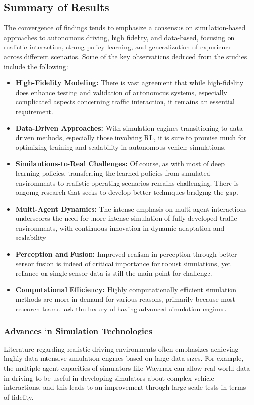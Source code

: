 \documentclass[lettersize,journal]{IEEEtran}
\begin{document}
\subsection{Summary of Results}
The convergence of findings tends to emphasize a consensus on simulation-based approaches to autonomous driving, high fidelity, and data-based, focusing on realistic interaction, strong policy learning, and generalization of experience across different scenarios. Some of the key observations deduced from the studies include the following:

\begin{itemize}
    \item \textbf{High-Fidelity Modeling:} There is vast agreement that while high-fidelity does enhance testing and validation of autonomous systems, especially complicated aspects concerning traffic interaction, it remains an essential requirement.
    \item \textbf{Data-Driven Approaches:} With simulation engines transitioning to data-driven methods, especially those involving RL, it is sure to promise much for optimizing training and scalability in autonomous vehicle simulations.
    \item \textbf{Similautions-to-Real Challenges:} Of course, as with most of deep learning policies, transferring the learned policies from simulated environments to realistic operating scenarios remains challenging. There is ongoing research that seeks to develop better techniques bridging the gap.
    \item \textbf{Multi-Agent Dynamics:} The intense emphasis on multi-agent interactions underscores the need for more intense simulation of fully developed traffic environments, with continuous innovation in dynamic adaptation and scalability.
    \item \textbf{Perception and Fusion:} Improved realism in perception through better sensor fusion is indeed of critical importance for robust simulations, yet reliance on single-sensor data is still the main point for challenge.
    \item \textbf{Computational Efficiency:} Highly computationally efficient simulation methods are more in demand for various reasons, primarily because most research teams lack the luxury of having advanced simulation engines.
\end{itemize}

\subsubsection{Advances in Simulation Technologies}
Literature regarding realistic driving environments often emphasizes achieving highly data-intensive simulation engines based on large data sizes. For example, the multiple agent capacities of simulators like Waymax can allow real-world data in driving to be useful in developing simulators about complex vehicle interactions, and this leads to an improvement through large scale tests in terms of fidelity.
\end{document}
